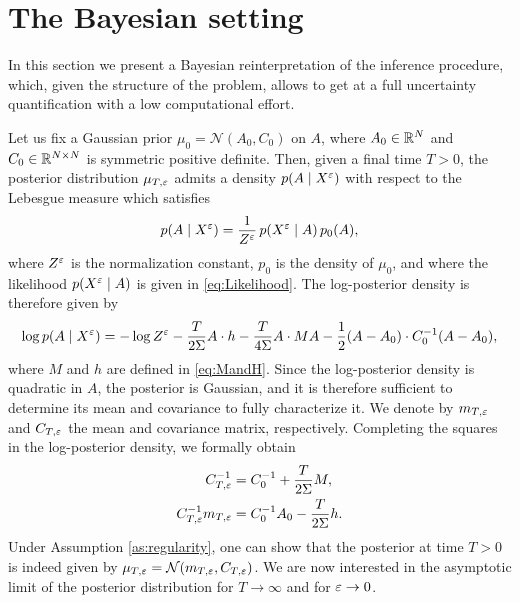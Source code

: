 \documentclass[10pt]{article}
\begin{document}


\section{The Bayesian setting}\label{sec:Bayesian}

In this section we present a Bayesian reinterpretation of the inference procedure, which, given the structure of the problem, allows to get at a full uncertainty quantification with a low computational effort. 

Let us fix a Gaussian prior $\mu_0 = \mathcal N(A_0, C_0)$ on $A$, where $A_0 \in \mathbb{R}^N$ and $C_0 \in \mathbb{R}^{N\times N}$ is symmetric positive definite. Then, given a final time $T > 0$, the posterior distribution $\mu_{T,\varepsilon}$ admits a density $p(A \mid X^\varepsilon)$ with respect to the Lebesgue measure which satisfies
\begin{equation}
p(A \mid X^\varepsilon) = \frac1{Z^\varepsilon} \, p(X^\varepsilon \mid A) \, p_0(A),
\end{equation}
where $Z^\varepsilon$ is the normalization constant, $p_0$ is the density of $\mu_0$, and where the likelihood $p(X^\varepsilon \mid A)$ is given in \eqref{eq:Likelihood}. The log-posterior density is therefore given by
\begin{equation}\label{eq:Posterior}
\log p(A \mid X^\varepsilon) = -\log Z^\varepsilon - \frac{T}{2\Sigma} A \cdot h - \frac{T}{4\Sigma} A \cdot M A - \frac12 (A - A_0) \cdot C_0^{-1}(A-A_0),
\end{equation}
where $M$ and $h$ are defined in \eqref{eq:MandH}.
Since the log-posterior density is quadratic in $A$, the posterior is Gaussian, and it is therefore sufficient to determine its mean and covariance to fully characterize it. We denote by $m_{T,\varepsilon}$ and $C_{T,\varepsilon}$ the mean and covariance matrix, respectively. Completing the squares in the log-posterior density, we formally obtain
\begin{equation}
\begin{aligned}
C_{T,\varepsilon}^{-1} &= C_0^{-1} + \frac{T}{2\Sigma} M, \\
C_{T,\varepsilon}^{-1}m_{T,\varepsilon} &= C_0^{-1}A_0 - \frac{T}{2\Sigma} h. 
\end{aligned}
\end{equation}
Under Assumption \ref{as:regularity}, one can show that the posterior at time $T > 0$ is indeed given by $\mu_{T,\varepsilon} = \mathcal N(m_{T,\varepsilon}, C_{T,\varepsilon})$. We are now interested in the asymptotic limit of the posterior distribution for $T \to \infty$ and for $\varepsilon \to 0$.
\end{document}
